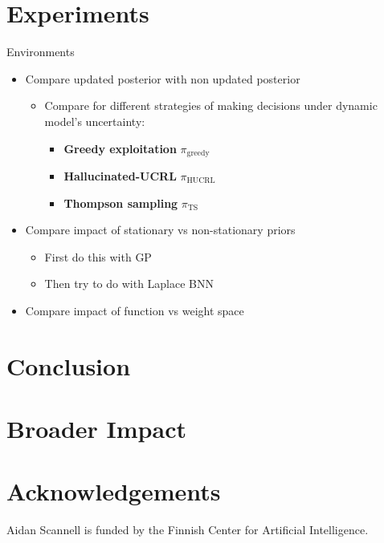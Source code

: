\documentclass{article}
\begin{document}
\section{Experiments}
Environments
\begin{itemize}
  \item Compare updated posterior with non updated posterior
  \begin{itemize}
  \item Compare for different strategies of making decisions under dynamic model's uncertainty:
    \begin{itemize}
      \item \textbf{Greedy exploitation} \(\pi_{\text{greedy}}\)
      \item \textbf{Hallucinated-UCRL} \(\pi_{\text{HUCRL}}\)
      \item \textbf{Thompson sampling} \(\pi_{\text{TS}}\)
    \end{itemize}
  \end{itemize}
  \item Compare impact of stationary vs non-stationary priors
  \begin{itemize}
    \item First do this with GP
    \item Then try to do with Laplace BNN
  \end{itemize}
  \item Compare impact of function vs weight space
\end{itemize}

\section{Conclusion} \label{sec:conclusion}


\section*{Broader Impact}

\section*{Acknowledgements}
Aidan Scannell is funded by the Finnish Center for Artificial Intelligence.

\small
\printbibliography
\normalsize
\end{document}
